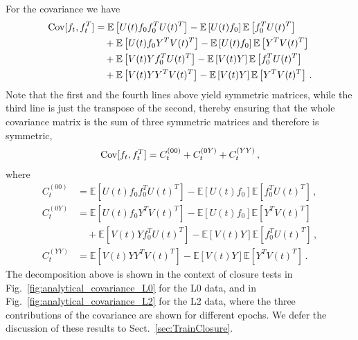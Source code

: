 For the covariance we have 
\begin{align}
    \mathrm{Cov}[f_t,f_t^T]
        &= \mathbb{E}\left[U(t) f_0 f_0^T U(t)^T\right] 
            - \mathbb{E}\left[U(t) f_0\right] \mathbb{E}\left[f_0^T U(t)^T\right]  \nonumber \\
        &\quad + \mathbb{E}\left[U(t) f_0 Y^T V(t)^T\right] 
            - \mathbb{E}\left[U(t) f_0\right] \mathbb{E}\left[Y^T V(t)^T\right] \nonumber \\
        &\quad + \mathbb{E}\left[V(t) Y f_0^T U(t)^T\right]
            - \mathbb{E}\left[V(t) Y\right] \mathbb{E}\left[f_0^T U(t)^T\right] \nonumber \\
    \label{eq:CovAtT}
        &\quad + \mathbb{E}\left[V(t) Y Y^T V(t)^T\right]
            - \mathbb{E}\left[V(t) Y\right] \mathbb{E}\left[Y^T V(t)^T\right] \, .
\end{align}
Note that the first and the fourth lines above yield symmetric matrices, while the third line is just the 
transpose of the second, thereby ensuring that the whole covariance matrix is the sum of three symmetric 
matrices and therefore is symmetric, 
\begin{align}
    \label{eq:SumOfCovariances}
    \mathrm{Cov}[f_t,f_t^T] = C_t^{(00)} + C_t^{(0Y)} + C_t^{(YY)}\, ,
\end{align}
where
\begin{align}
    \label{eq:C00term}
    C_t^{(00)} 
        &= \mathbb{E}\left[U(t) f_0 f_0^T U(t)^T\right] 
        - \mathbb{E}\left[U(t) f_0\right] \mathbb{E}\left[f_0^T U(t)^T\right]\, ,\\
    C_t^{(0Y)}
        &= \mathbb{E}\left[U(t) f_0 Y^T V(t)^T\right] 
        - \mathbb{E}\left[U(t) f_0\right] \mathbb{E}\left[Y^T V(t)^T\right] \nonumber \\
        \label{eq:C0Yterm}
        &\quad + \mathbb{E}\left[V(t) Y f_0^T U(t)^T\right]
            - \mathbb{E}\left[V(t) Y\right] \mathbb{E}\left[f_0^T U(t)^T\right] \, ,\\
    C_t^{(YY)}
        &= \mathbb{E}\left[V(t) Y Y^T V(t)^T\right]
        - \mathbb{E}\left[V(t) Y\right] \mathbb{E}\left[Y^T V(t)^T\right]\, .
\end{align}
The decomposition above is shown in the context of closure tests in Fig.~\ref{fig:analytical_covariance_L0} 
for the L0 data, and in
Fig.~\ref{fig:analytical_covariance_L2} for the L2 data, where the three contributions of the covariance
are shown for different epochs. We defer the discussion of these results to Sect.~\ref{sec:TrainClosure}.

\FloatBarrier